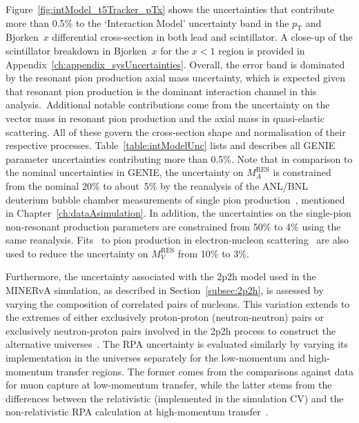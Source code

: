 Figure~\ref{fig:intModel_t5Tracker_pTx} shows the uncertainties that contribute more than 0.5\% to the `Interaction Model' uncertainty band in the $p_{\text{T}}$ and Bjorken~$x$ differential cross-section in both lead and scintillator. A close-up of the scintillator breakdown in Bjorken~$x$ for the $x<1$ region is provided in Appendix~\ref{ch:appendix_sysUncertainties}. Overall, the error band is dominated by the resonant pion production axial mass uncertainty, which is expected given that resonant pion production is the dominant interaction channel in this analysis.~Additional notable contributions come from the uncertainty on the vector mass in resonant pion production and the axial mass in quasi-elastic scattering. All of these govern the cross-section shape and normalisation of their respective processes. Table~\ref{table:intModelUnc} lists and describes all GENIE parameter uncertainties contributing more than 0.5\%. Note that in comparison to the nominal uncertainties in GENIE, the uncertainty on $M_A^{\text{RES}}$ is constrained from the nominal 20\% to about~5\% by the reanalysis of the ANL/BNL deuterium bubble chamber measurements of single pion production~\cite{pion_Rodrigues_2016}, mentioned in Chapter~\ref{ch:dataAsimulation}. In addition, the uncertainties on the single-pion non-resonant production parameters are constrained from 50\% to 4\% using the same reanalysis. Fits~\cite{PhysRevD.74.014009} to pion production in electron-nucleon scattering~\cite{Tiator_2004} are also used to reduce the uncertainty on $M_V^{\text{RES}}$ from 10\% to 3\%.

Furthermore, the uncertainty associated with the 2p2h model used in the MINERvA simulation, as described in Section~\ref{subsec:2p2h}, is assessed by varying the composition of correlated pairs of nucleons. This variation extends to the extremes of either exclusively proton-proton (neutron-neutron) pairs or exclusively neutron-proton pairs involved in the 2p2h process to construct the alternative universes~\cite{Gran2018_PhysRevLett.120.221805}. The RPA uncertainty is evaluated similarly by varying its implementation in the universes separately for the low-momentum and high-momentum transfer regions.\enlargethispage{1\baselineskip} The former comes from the comparisons against data for muon capture at low-momentum transfer, while the latter stems from the differences between the relativistic (implemented in the simulation CV) and the non-relativistic RPA calculation at high-momentum transfer~\cite{gran2017model}.

